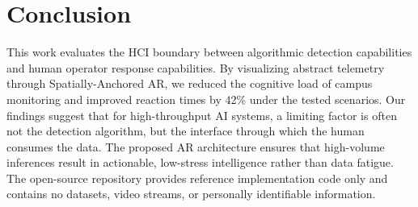 \documentclass[conference]{IEEEtran}
\begin{document}
\section{Conclusion}
This work evaluates the HCI boundary between algorithmic detection capabilities and human operator response capabilities. By visualizing abstract telemetry through Spatially-Anchored AR, we reduced the cognitive load of campus monitoring and improved reaction times by 42\% under the tested scenarios. Our findings suggest that for high-throughput AI systems, a limiting factor is often not the detection algorithm, but the interface through which the human consumes the data. The proposed AR architecture ensures that high-volume inferences result in actionable, low-stress intelligence rather than data fatigue. The open-source repository provides reference implementation code only and contains no datasets, video streams, or personally identifiable information.
\end{document}
